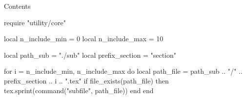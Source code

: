 \documentclass[10pt]{beamer}
\date{\today}
\title{}
\author{}
\begin{document}
\maketitle

\begin{frame}{Contents}
    \tableofcontents
\end{frame}

\begin{luacode*}
    require "utility/core"

    local n_include_min = 0
    local n_include_max = 10

    local path_sub = "./sub"
    local prefix_section = "section"

    for i = n_include_min, n_include_max do
        local path_file = path_sub .. "/" .. prefix_section .. i .. ".tex"
        if file_exists(path_file) then
            tex.sprint(command("subfile", path_file))
        end
    end
\end{luacode*}



\end{document}

